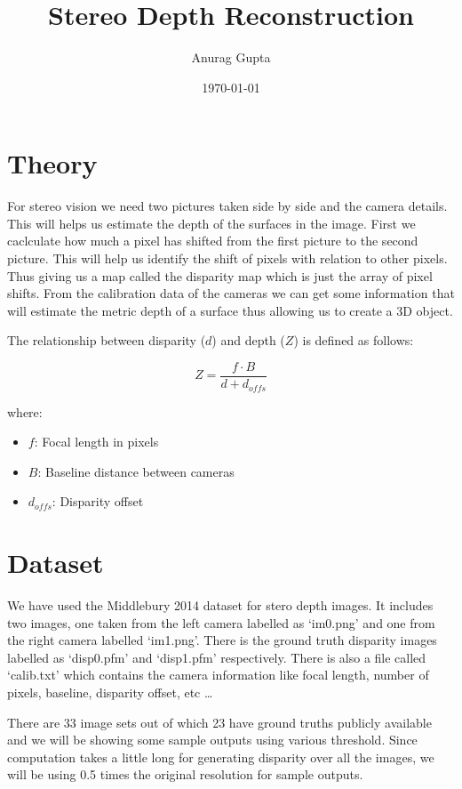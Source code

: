 \documentclass[12pt]{article}
\title{Stereo Depth Reconstruction}
\author{Anurag Gupta}
\date{\today}
\begin{document}
\maketitle

\begin{multicols}{2}

\section{Theory}


For stereo vision we need two pictures taken side by side and the camera details. This will helps us estimate the depth of the surfaces in the image.
First we caclculate how much a pixel has shifted from the first picture to the second picture. This will help us identify the shift of pixels 
with relation to other pixels. Thus giving us a map called the disparity map which is just the array of pixel shifts. From the calibration data of 
the cameras we can get some information that will estimate the metric depth of a surface thus allowing us to create a 3D object.

The  relationship between disparity ($d$) and depth ($Z$) is defined as follows:

\begin{equation}
Z = \frac{f \cdot B}{d + d_{offs}}
\end{equation}

where:
\begin{itemize}
    \item $f$: Focal length in pixels 
    \item $B$: Baseline distance between cameras 
    \item $d_{offs}$: Disparity offset 
\end{itemize}



\section{Dataset}
\bigskip
We have used the Middlebury 2014 dataset for stero depth images. It includes two images, one taken from the left camera labelled as `im0.png' and one from the right camera labelled
`im1.png'. There is the ground truth disparity images labelled as `disp0.pfm' and `disp1.pfm' respectively. There is also a file called `calib.txt' which contains the camera information
like focal length, number of pixels, baseline, disparity offset, etc \ldots

There are 33 image sets out of which 23 have ground truths publicly available and we will be showing some sample outputs using various threshold. Since computation takes a little long 
for generating disparity over all the images, we will be using 0.5 times the original resolution for sample outputs.



\end{multicols}
\end{document}
